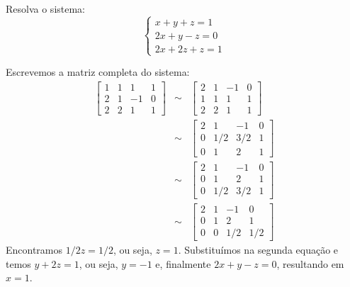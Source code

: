 \begin{ex} Resolva o sistema:
$$\left\{
\begin{array}{c}
x+y+z=1\\
2x+y-z=0\\
2x+2z+z=1
\end{array}\right.
$$
\end{ex}
\begin{sol}
Escrevemos a matriz completa do sistema:
\begin{eqnarray*}\left[
\begin{array}{ccc|c}
1 &1& 1&1\\
2 &1& -1&0\\
2 & 2 &1&1
\end{array}
\right] &\sim& \left[
\begin{array}{ccc|c}
2 &1& -1&0\\
1 &1& 1&1\\
2 & 2 &1&1
\end{array}
\right] \\ & \sim & \left[
\begin{array}{ccc|c}
2 &1& -1&0\\
0 &1/2& 3/2&1\\
0 & 1 &2&1
\end{array}
\right]\\ & \sim & \left[
\begin{array}{ccc|c}
2 &1& -1&0\\
0 & 1 &2&1\\
0 &1/2& 3/2&1
\end{array}
\right]\\ & \sim & \left[
\begin{array}{ccc|c}
2 &1& -1&0\\
0 & 1 &2&1\\
0 &0& 1/2&1/2
\end{array}
\right]
\end{eqnarray*}
Encontramos $1/2z=1/2$, ou seja, $z=1$. Substituímos na segunda equação e temos $y+2z=1$, ou seja, $y=-1$ e, finalmente $2x+y-z=0$, resultando em $x=1$.
\end{sol}

